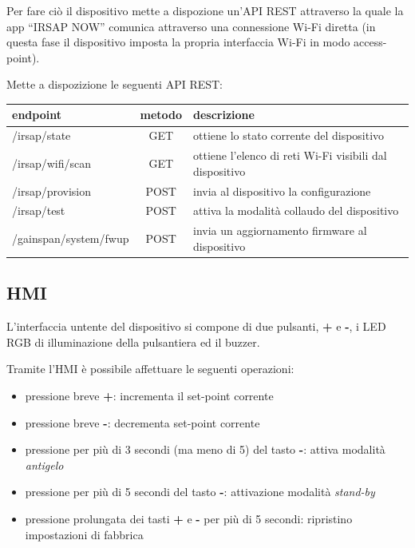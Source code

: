 \documentclass[12pt,a4paper,twoside,titlepage]{book}
\begin{document}
Per fare ciò il dispositivo mette a dispozione un'API REST attraverso la quale la
app ``IRSAP NOW'' comunica attraverso una connessione Wi-Fi diretta (in questa fase
il dispositivo imposta la propria interfaccia Wi-Fi in modo access-point).

Mette a dispozizione le seguenti API REST:

\begin{center}
\begin{tabular}{| l | c | l |}
    \hline \textbf{endpoint} & \textbf{metodo} & \textbf{descrizione} \\
    \hline /irsap/state & GET & ottiene lo stato corrente del dispositivo \\
    \hline /irsap/wifi/scan & GET & ottiene l'elenco di reti Wi-Fi visibili dal dispositivo \\
    \hline /irsap/provision & POST & invia al dispositivo la configurazione \\
    \hline /irsap/test & POST & attiva la modalità collaudo del dispositivo \\
    \hline /gainspan/system/fwup & POST & invia un aggiornamento firmware al dispositivo \\
    \hline
\end{tabular}
\end{center}

\subsection{HMI}

L'interfaccia untente del dispositivo si compone di due pulsanti, \textbf{+} e \textbf{-},
i LED RGB di illuminazione della pulsantiera ed il buzzer.

Tramite l'HMI è possibile affettuare le seguenti operazioni:

\begin{itemize}
    \item pressione breve \textbf{+}: incrementa il set-point corrente
    \item pressione breve \textbf{-}: decrementa set-point corrente
    \item pressione per più di 3 secondi (ma meno di 5) del tasto \textbf{-}:
        attiva modalità \textit{antigelo}
    \item pressione per più di 5 secondi del tasto \textbf{-}: attivazione modalità
        \textit{stand-by}
    \item pressione prolungata dei tasti \textbf{+} e \textbf{-} per più di 5 secondi:
        ripristino impostazioni di fabbrica
\end{itemize}
\end{document}
